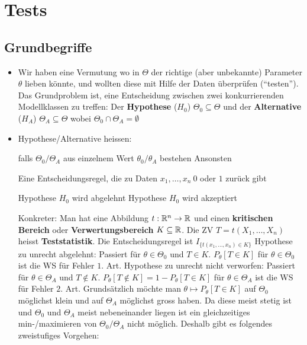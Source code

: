 
\section{Tests}
\subsection{Grundbegriffe}
\begin{itemize}
    \item Wir haben eine Vermutung wo in $\Theta$ der richtige (aber unbekannte) Parameter $\theta$ lieben könnte, und wollten diese mit Hilfe der Daten überprüfen (``testen''). Das Grundproblem ist, eine Entscheidung zwischen zwei konkurrierenden Modellklassen zu treffen: Der \textbf{Hypothese} ($H_0$) $\Theta_0 \subseteq \Theta$ und der \textbf{Alternative} ($H_A$) $\Theta_A \subseteq \Theta$ wobei $\Theta_0 \cap \Theta_A = \emptyset$
    \item Hypothese/Alternative heissen:
        \begin{itemize}
             falls $\Theta_0/\Theta_A$ aus einzelnem Wert $\theta_0/\theta_A$ bestehen
             Ansonsten
        \end{itemize}
     Eine Entscheidungsregel, die zu Daten $x_1, \dots, x_n \ 0$ oder $1$ zurück gibt
        \begin{itemize}
             Hypothese $H_0$ wird abgelehnt
             Hypothese $H_0$ wird akzeptiert
        \end{itemize}
        Konkreter: Man hat eine Abbildung $t: \mathbb{R}^n \to \mathbb{R}$ und einen \textbf{kritischen Bereich} oder \textbf{Verwertungsbereich} $K \subseteq \mathbb{R}$. Die ZV $T = t(X_1, \dots, X_n)$ heisst \textbf{Teststatistik}. Die Entscheidungsregel ist $I_{\{t(x_1, \dots, x_n) \in K\}}$
         Hypothese zu unrecht abgelehnt: Passiert für $\theta \in \Theta_0$ und $T \in K$. $P_\theta[T \in K]$ für $\theta \in \Theta_0$ ist die WS für Fehler $1.$ Art.
         Hypothese zu unrecht nicht verworfen: Passiert für $\theta \in \Theta_A$ und $T \notin K$. $P_\theta[T \notin K] = 1 - P_\theta[T \in K]$ für $\theta \in \Theta_A$ ist die WS für Fehler $2.$ Art.
     Grundsätzlich möchte man $\theta \mapsto P_\theta[T \in K]$ auf $\Theta_0$ möglichst klein und auf $\Theta_A$ möglichst gross haben. Da diese meist stetig ist und $\Theta_0$ und $\Theta_A$ meist nebeneinander liegen ist ein gleichzeitiges min-/maximieren von $\Theta_0/\Theta_A$ nicht möglich. Deshalb gibt es folgendes zweistufiges Vorgehen:

\end{itemize}
